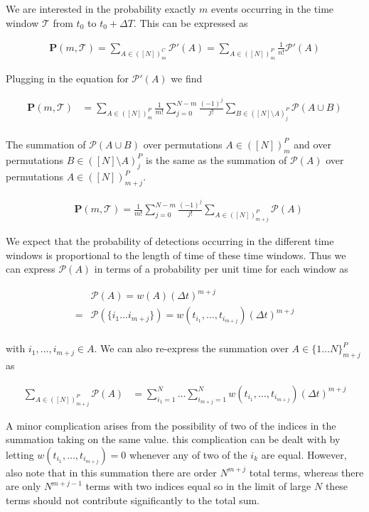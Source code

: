 \documentclass[12pt]{article}
\newcommand{\bv}[1]{\boldsymbol{#1}}
\begin{document}
We are interested in the probability exactly $m$ events occurring in the time window $\mathcal{T}$ from $t_0$ to $t_0 + \Delta T$. This can be expressed as

\begin{align}
\label{Eq:Probn}
\bv{P}(m,\mathcal{T}) = \sum_{A \in ([N])_m^C} \mathcal{P}'(A) = \sum_{A \in ([N])_m^P} \frac{1}{n!}\mathcal{P}'(A)
\end{align}

Plugging in the equation for $\mathcal{P}'(A)$ we find

\begin{align}
\bv{P}(m,\mathcal{T}) &=\sum_{A \in ([N])_m^P} \frac{1}{m!} \sum_{j=0}^{N-m} \frac{(-1)^j}{j!} \sum_{B \in ([N] \setminus A)_j^P} \mathcal{P}(A \cup B)\\
\end{align}

The summation of $\mathcal{P}(A \cup B)$ over permutations $A\in ([N])_m^P$  and over permutations $B \in ([N]\setminus A)_j^P$  is the same as the summation of $\mathcal{P}(A)$ over permutations $A \in ([N])_{m+j}^P$.

\begin{align}
\label{eq:Pn2}
& \bv{P}(m,\mathcal{T}) = \frac{1}{m!} \sum_{j=0}^{N-m} \frac{(-1)^j}{j!} \sum_{A \in ([N])_{m+j}^P} \mathcal{P}(A)
\end{align}

We expect that the probability of detections occurring in the different time windows is proportional to the length of time of these time windows. Thus we can express $\mathcal{P}(A)$ in terms of a probability per unit time for each window as

\begin{align}
&\mathcal{P}(A) = w(A)(\Delta t)^{m+j}\\
=&\mathcal{P}(\{i_1 \ldots i_{m+j} \}) = w(t_{i_1}, \ldots, t_{i_{m+j}}) (\Delta t)^{m+j}\\
\end{align}

with $i_1, \ldots, i_{m+j} \in A$. We can also re-express the summation over $A \in \{1 \ldots N\}_{m+j}^P$ as 

\begin{align}
\sum_{A \in ([N])_{m+j}^P} \mathcal{P}(A) &= \sum_{i_1 = 1}^N \ldots \sum_{i_{m+j} = 1}^N w(t_{i_1}, \ldots, t_{i_{m+j}}) (\Delta t)^{m+j}
\end{align}

A minor complication arises from the possibility of two of the indices in the summation taking on the same value. this complication can be dealt with by letting $w(t_{i_1}, \ldots, t_{i_{m+j}})=0$ whenever any of two of the $i_k$ are equal. However, also note that in this summation there are order $N^{m+j}$ total terms, whereas there are only $N^{m+j-1}$ terms with two indices equal so in the limit of large $N$ these terms should not contribute significantly to the total sum. 
\end{document}
